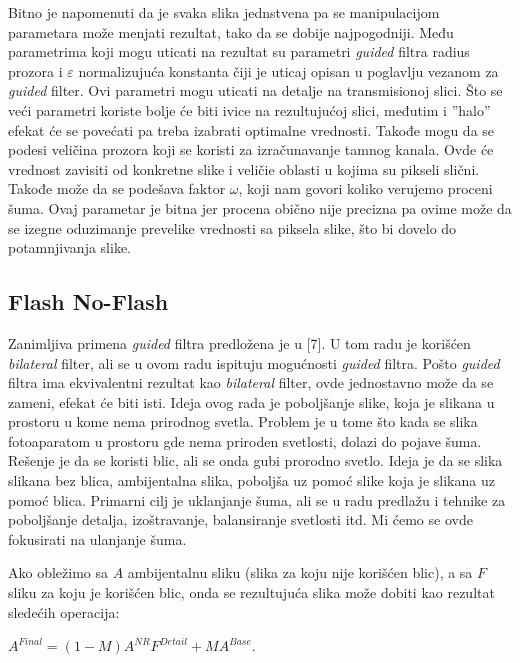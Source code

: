\documentclass[a4paper,12pt,titlepage]{article}
\begin{document}
Bitno je napomenuti da je svaka slika jednstvena pa se manipulacijom parametara može menjati rezultat, tako da se dobije najpogodniji. Među parametrima koji mogu uticati na rezultat su parametri \emph{guided} filtra radius prozora i $\varepsilon$ normalizujuća konstanta čiji je uticaj opisan u poglavlju vezanom za \emph{guided} filter. Ovi parametri mogu uticati na detalje na transmisionoj slici. Što se veći parametri koriste bolje će biti ivice na rezultujućoj slici, međutim i ''halo'' efekat će se povećati pa treba izabrati optimalne vrednosti. Takođe mogu da se podesi veličina prozora koji se koristi za izračunavanje tamnog kanala. Ovde će vrednost zavisiti od konkretne slike i veličie oblasti u kojima su pikseli slični. Takođe može da se podešava faktor $\omega$, koji nam govori koliko verujemo proceni šuma. Ovaj parametar je bitna jer procena obično nije precizna pa ovime može da se izegne oduzimanje prevelike vrednosti sa piksela slike, što bi dovelo do potamnjivanja slike.
 
\subsection{Flash No-Flash}%

Zanimljiva primena \emph{guided} filtra predložena je u [7]. U tom radu je korišćen \emph{bilateral} filter, ali se u ovom radu ispituju mogućnosti \emph{guided} filtra. Pošto \emph{guided} filtra ima ekvivalentni rezultat kao \emph{bilateral} filter, ovde jednostavno može da se zameni, efekat će biti isti. Ideja ovog rada je poboljšanje slike, koja je slikana u prostoru u kome nema prirodnog svetla. Problem je u tome što kada se slika fotoaparatom u prostoru gde nema priroden svetlosti, dolazi do pojave šuma. Rešenje je da se koristi blic, ali se onda gubi prorodno svetlo. Ideja je da se slika slikana bez blica, ambijentalna slika, poboljša uz pomoć slike koja je slikana uz pomoć blica. Primarni cilj je uklanjanje šuma, ali se u radu predlažu i tehnike za poboljšanje detalja, izoštravanje, balansiranje svetlosti itd. Mi ćemo se ovde fokusirati na ulanjanje šuma. 

Ako obležimo sa $A$ ambijentalnu sliku (slika za koju nije korišćen blic), a sa $F$ sliku za koju je korišćen blic, onda se rezultujuća slika može dobiti kao rezultat sledećih operacija:

\begin{center}
$A^{Final} = (1 - M)A^{NR}F^{Detail} + MA^{Base}$.
\end{center}
\end{document}

